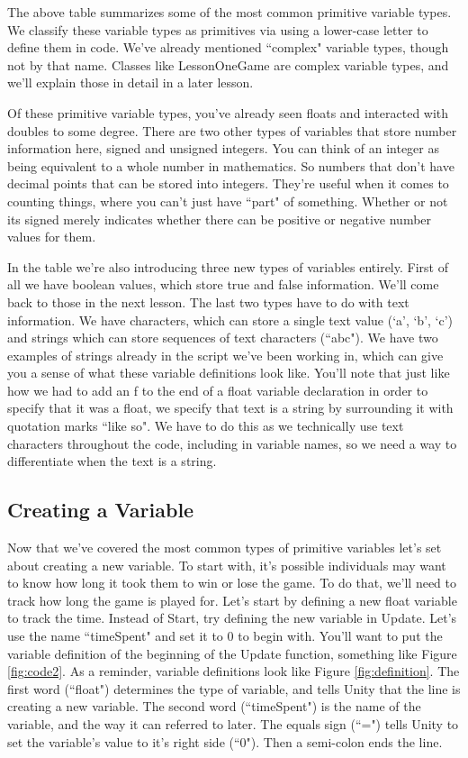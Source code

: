 \documentclass{article}
\begin{document}
The above table summarizes some of the most common primitive variable types. We classify these variable types as primitives via using a lower-case letter to define them in code. We've already mentioned ``complex" variable types, though not by that name. Classes like LessonOneGame are complex variable types, and we'll explain those in detail in a later lesson.

Of these primitive variable types, you've already seen floats and interacted with doubles to some degree. There are two other types of variables that store number information here, signed and unsigned integers. You can think of an integer as being equivalent to a whole number in mathematics. So numbers that don't have decimal points that can be stored into integers. They're useful when it comes to counting things, where you can't just have ``part" of something. Whether or not its signed merely indicates whether there can be positive or negative number values for them. 

In the table we're also introducing three new types of variables entirely. First of all we have boolean values, which store true and false information. We'll come back to those in the next lesson. The last two types have to do with text information. We have characters, which can store a single text value (`a', `b', `c') and strings which can store sequences of text characters (``abc"). We have two examples of strings already in the script we've been working in, which can give you a sense of what these variable definitions look like. You'll note that just like how we had to add an f to the end of a float variable declaration in order to specify that it was a float, we specify that text is a string by surrounding it with quotation marks ``like so". We have to do this as we technically use text characters throughout the code, including in variable names, so we need a way to differentiate when the text is a string.

\subsection{Creating a Variable}

Now that we've covered the most common types of primitive variables let's set about creating a new variable. To start with, it's possible individuals may want to know how long it took them to win or lose the game. To do that, we'll need to track how long the game is played for. Let's start by defining a new float variable to track the time. Instead of Start, try defining the new variable in Update. Let's use the name ``timeSpent" and set it to 0 to begin with. You'll want to put the variable definition of the beginning of the Update function, something like Figure \ref{fig:code2}. As a reminder, variable definitions look like Figure \ref{fig:definition}. The first word (``float") determines the type of variable, and tells Unity that the line is creating a new variable. The second word (``timeSpent") is the name of the variable, and the way it can referred to later. The equals sign (``=") tells Unity to set the variable's value to it's right side (``0"). Then a semi-colon ends the line.
\end{document}
